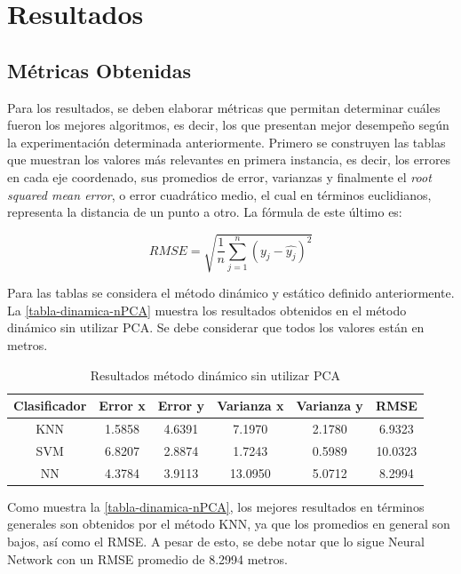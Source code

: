 \chapter{Resultados}

\section{Métricas Obtenidas}

Para los resultados, se deben elaborar métricas que permitan determinar cuáles fueron los mejores algoritmos, es decir, los que presentan mejor desempeño según la experimentación determinada anteriormente. Primero se construyen las tablas que muestran los valores más relevantes en primera instancia, es decir, los errores en cada eje coordenado, sus promedios de error, varianzas y finalmente el \textit{root squared mean error}, o error cuadrático medio, el cual en términos euclidianos, representa la distancia de un punto a otro. La fórmula de este último es:

\begin{equation}
RMSE = \sqrt{\frac{1}{n} \sum_{j=1}^{n}(y_{j} - \hat{y_{j}})^{2}} 
\end{equation}

Para las tablas se considera el método dinámico y estático definido anteriormente. La \autoref{tabla-dinamica-nPCA} muestra los resultados obtenidos en el método dinámico sin utilizar PCA. Se debe considerar que todos los valores están en metros.


\begin{table}[ht!]
\centering
\caption[Resultados método dinámico sin  utilizar PCA]{Resultados método dinámico sin  utilizar PCA}
\label{tabla-dinamica-nPCA}
\begin{tabular}{|c|c|c|c|c|c|}
\hline
Clasificador & Error x & Error y & Varianza x & Varianza y & RMSE    \\ \hline
KNN          & 1.5858  & 4.6391  & 7.1970     & 2.1780     & 6.9323  \\ \hline
SVM          & 6.8207  & 2.8874  & 1.7243     & 0.5989     & 10.0323 \\ \hline
NN           & 4.3784  & 3.9113  & 13.0950    & 5.0712     & 8.2994  \\ \hline
\end{tabular}
\end{table}


Como muestra la \autoref{tabla-dinamica-nPCA}, los mejores resultados en términos generales son obtenidos por el método KNN, ya que los promedios en general son bajos, así como el RMSE. A pesar de esto, se debe notar que lo sigue Neural Network con un RMSE promedio de 8.2994 metros. 


